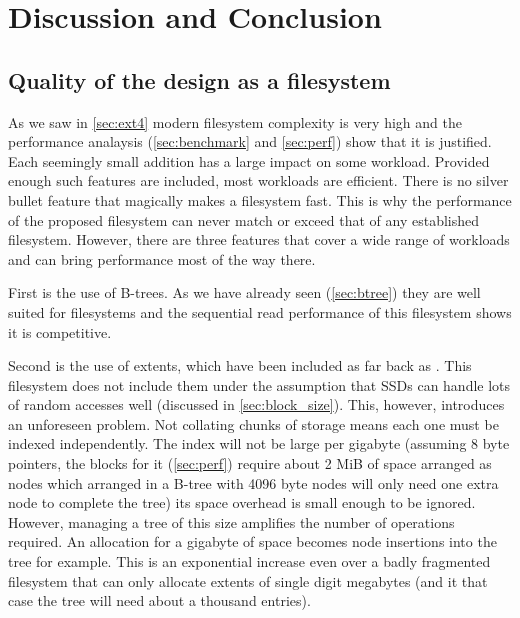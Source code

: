 \chapter{Discussion and Conclusion}

    \section{Quality of the design as a filesystem}
        \label{sec:implementation_discussion}

        As we saw in \autoref{sec:ext4} modern filesystem complexity is very high and the performance
        analaysis (\autoref{sec:benchmark} and \autoref{sec:perf}) show that it is
        justified. Each seemingly small addition has a large impact on some
        workload. Provided enough such features are included, most workloads
        are efficient. There is no silver bullet feature that magically makes a
        filesystem fast. This is why the performance of the proposed filesystem
        can never match or exceed that of any established filesystem. However,
        there are three features that cover a wide range of workloads and can
        bring performance most of the way there.

        First is the use of B-trees. As we have already seen (\autoref{sec:btree})
        they are well suited for filesystems and the sequential read performance of this
        filesystem shows it is competitive.

        Second is the use of extents, which have been included as far back as
        . This filesystem does not include them under the
        assumption that SSDs can handle lots of random accesses well (discussed
        in \autoref{sec:block_size}). This, however, introduces an unforeseen
        problem. Not collating chunks of storage means each one must be indexed
        independently. The index will not be large per gigabyte (assuming 8
        byte pointers, the  blocks for it (\autoref{sec:perf}) require
        about 2 MiB of space arranged as nodes which arranged in a B-tree with 4096 byte nodes will only
        need one extra node to complete the tree) its space overhead is
        small enough to be ignored. However, managing a tree of this size
        amplifies the number of operations required. An allocation for a
        gigabyte of space becomes  node insertions into the
        tree for example. This is an exponential increase even over a badly
        fragmented filesystem that can only allocate extents of single digit
        megabytes (and it that case the tree will need about a thousand
        entries).

